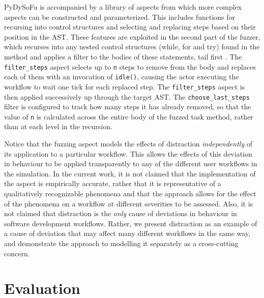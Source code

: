 \documentclass{llncs}
\begin{document}
PyDySoFu is accompanied by a library of aspects from which more complex aspects can be constructed and parameterized.
This includes functions for recursing into control structures and selecting and replacing steps based on their position
in the AST.  These features are exploited in the second part of the fuzzer, which recurses into any nested control
structures (while, for and try) found in the method and applies a filter to the bodies of these statements, tail first .
The \lstinline!filter_steps! aspect selects up to \lstinline!n! steps to remove from the body and replaces each of them
with an invocation of \lstinline!idle()!, causing the actor executing the workflow to wait one tick for each replaced
step.  The \lstinline!filter_steps! aspect is then applied successively up through the target AST.  The
\lstinline!choose_last_steps! filter is configured to track how many steps it has already removed, so that the value of
\lstinline!n! is calculated across the entire body of the fuzzed task method, rather than at each level in the
recursion.

Notice that the fuzzing aspect models the effects of distraction \emph{independently} of its application to a particular
workflow.  This allows the effects of this deviation in behaviour to be applied transparently to any of the different
user workflows in the simulation. In the current work, it is not claimed that the implementation of the aspect is
empirically accurate, rather that it is representative of a qualitatively recognizable phenomena and that the approach
allows for the effect of the phenomena on a workflow at different severities to be assessed.  Also, it is not claimed
that distraction is the \emph{only} cause of deviations in behaviour in software development workflows.  Rather, we
present distraction as an example of a cause of deviation that may affect many different workflows in the same way, and
demonstrate the approach to modelling it separately as a cross-cutting concern.
 

\section{Evaluation}
\label{sec:evaluation}

\end{document}
